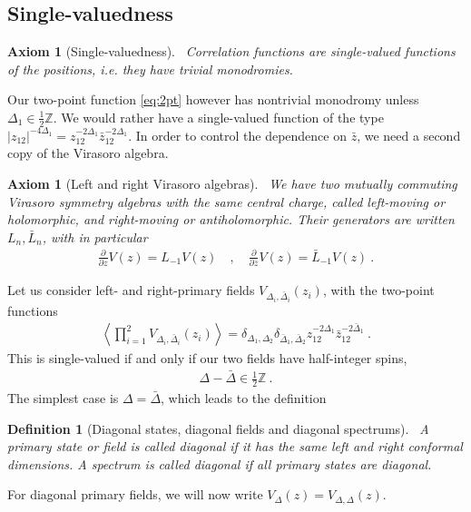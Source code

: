 \documentclass[12pt, a4paper]{article}
\theoremstyle{break}
\newtheorem{hyp}[exo]{Axiom}
\newtheorem{defn}[exo]{Definition}
\begin{document}
\subsection{Single-valuedness}\label{sec:sv}

\begin{hyp}[Single-valuedness]
 ~\label{hyp:sv}
 Correlation functions are single-valued functions of the positions, i.e. they have trivial monodromies.
\end{hyp}
Our two-point function \eqref{eq:2pt} however has nontrivial monodromy unless $\Delta_1\in \frac12\mathbb{Z}$. 
We would rather have a single-valued function of the type $|z_{12}|^{-4\Delta_1} = z_{12}^{-2\Delta_1} \bar z_{12}^{-2\Delta_1}$.
In order to control the dependence on $\bar z$, we need  a second copy of the Virasoro algebra.

\begin{hyp}[Left and right Virasoro algebras]
 ~\label{hyp:lr}
 We have two mutually commuting Virasoro symmetry algebras with the same central charge, called left-moving or holomorphic, and right-moving or antiholomorphic. Their generators are written $L_n,\bar L_n$, with in particular
 \begin{align}
  \frac{\partial}{\partial z} V(z) = L_{-1}V(z)   \quad , \quad \frac{\partial}{\partial \bar z} V(z)= \bar L_{-1} V(z)   \ .
 \end{align}
\end{hyp}
Let us consider left- and right-primary fields $V_{\Delta_i,\bar\Delta_i}(z_i)$, with the 
two-point functions
\begin{align}
 \left<\prod_{i=1}^2 V_{\Delta_i,\bar\Delta_i}(z_i) \right> = \delta_{\Delta_1,\Delta_2}\delta_{\bar\Delta_1,\bar\Delta_2} z_{12}^{-2\Delta_1} \bar z_{12}^{-2\bar\Delta_1}\ .
\end{align}
This is single-valued if and only if our two fields have half-integer spins,
\begin{align}
 \Delta -\bar \Delta \in \frac12\mathbb{Z}\ .
\end{align} 
The simplest case is $\Delta=\bar\Delta$, which leads to the definition

\begin{defn}[Diagonal states, diagonal fields and diagonal spectrums]
 ~\label{def:diag}
 A primary state or field is called diagonal if it has the same left and right conformal dimensions. A spectrum is called diagonal if all primary states are diagonal.
\end{defn}
For diagonal primary fields, we will now write  $V_\Delta(z) = V_{\Delta,\Delta}(z)$.
\end{document}
